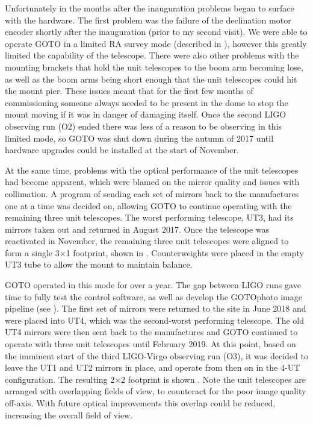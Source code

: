 \begin{colsection}
\begin{colsection}
Unfortunately in the months after the inauguration problems began to surface with the hardware. The first problem was the failure of the declination motor encoder shortly after the inauguration (prior to my second visit). We were able to operate GOTO in a limited RA survey mode (described in ), however this greatly limited the capability of the telescope. There were also other problems with the mounting brackets that hold the unit telescopes to the boom arm becoming lose, as well as the boom arms being short enough that the unit telescopes could hit the mount pier. These issues meant that for the first few months of commissioning someone always needed to be present in the dome to stop the mount moving if it was in danger of damaging itself. Once the second LIGO observing run (O2) ended there was less of a reason to be observing in this limited mode, so GOTO was shut down during the autumn of 2017 until hardware upgrades could be installed at the start of November.

At the same time, problems with the optical performance of the unit telescopes had become apparent, which were blamed on the mirror quality and issues with collimation. A program of sending each set of mirrors back to the manufactures one at a time was decided on, allowing GOTO to continue operating with the remaining three unit telescopes. The worst performing telescope, UT3, had its mirrors taken out and returned in August 2017. Once the telescope was reactivated in November, the remaining three unit telescopes were aligned to form a single 3$\times$1 footprint, shown in . Counterweights were placed in the empty UT3 tube to allow the mount to maintain balance.

GOTO operated in this mode for over a year. The gap between LIGO runs gave time to fully test the control software, as well as develop the GOTOphoto image pipeline (see ). The first set of mirrors were returned to the site in June 2018 and were placed into UT4, which was the second-worst performing telescope. The old UT4 mirrors were then sent back to the manufactures and GOTO continued to operate with three unit telescopes until February 2019. At this point, based on the imminent start of the third LIGO-Virgo observing run (O3), it was decided to leave the UT1 and UT2 mirrors in place, and operate from then on in the 4-UT configuration. The resulting 2$\times$2 footprint is shown . Note the unit telescopes are arranged with overlapping fields of view, to counteract for the poor image quality off-axis. With future optical improvements this overlap could be reduced, increasing the overall field of view.


\end{colsection}
\end{colsection}
